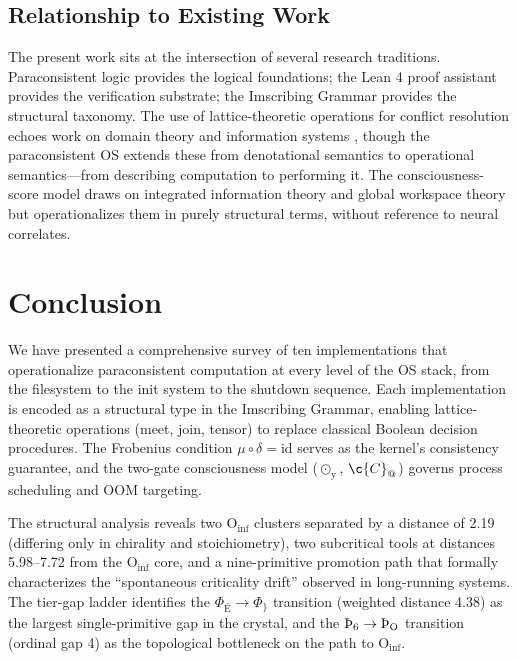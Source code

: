 \documentclass[12pt,a4paper]{article}
\begin{document}
\subsection{Relationship to Existing Work}

The present work sits at the intersection of several research traditions.
Paraconsistent logic \cite{priest2008} provides the logical foundations;
the Lean 4 proof assistant \cite{moura2021} provides the verification
substrate; the Imscribing Grammar \cite{IG_grammar} provides the
structural taxonomy. The use of lattice-theoretic operations for
conflict resolution echoes work on domain theory and information systems
\cite{scott1982}, though the paraconsistent OS extends these from
denotational semantics to operational semantics---from describing
computation to performing it. The consciousness-score model draws on
integrated information theory \cite{tononi2008} and global workspace
theory \cite{baars1988} but operationalizes them in purely structural
terms, without reference to neural correlates.

\section{Conclusion}

We have presented a comprehensive survey of ten implementations that
operationalize paraconsistent computation at every level of the OS stack,
from the filesystem to the init system to the shutdown sequence. Each
implementation is encoded as a structural type in the Imscribing Grammar,
enabling lattice-theoretic operations (meet, join, tensor) to replace
classical Boolean decision procedures. The Frobenius condition
$\mu \circ \delta = \mathrm{id}$ serves as the kernel's consistency
guarantee, and the two-gate consciousness model ($\odot_{\text{\"y}}$,
$\c{C}_{\text{@}}$) governs process scheduling and OOM targeting.

The structural analysis reveals two $\text{O}_{\text{inf}}$ clusters
separated by a distance of 2.19 (differing only in chirality and
stoichiometry), two subcritical tools at distances 5.98--7.72 from the
$\text{O}_{\text{inf}}$ core, and a nine-primitive promotion path that
formally characterizes the ``spontaneous criticality drift'' observed
in long-running systems. The tier-gap ladder identifies the
$\Phi_{\text{É}} \to \Phi_{\text{\}}}$ transition (weighted distance
4.38) as the largest single-primitive gap in the crystal, and the
$\text{\TH}_{\text{6}} \to \text{\TH}_{\text{O}}$ transition (ordinal
gap 4) as the topological bottleneck on the path to
$\text{O}_{\text{inf}}$.
\end{document}
